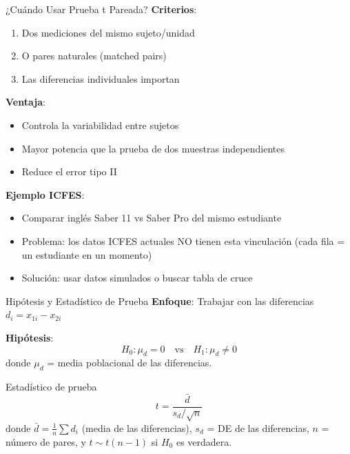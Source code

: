 \documentclass[aspectratio=169, 11pt]{beamer}
\begin{document}
\begin{frame}{¿Cuándo Usar Prueba t Pareada?}
\textbf{Criterios}:
\begin{enumerate}
  \item Dos mediciones del \alert{mismo} sujeto/unidad
  \item O pares naturales (matched pairs)
  \item Las diferencias individuales importan
\end{enumerate}

\vspace{0.3cm}
\textbf{Ventaja}:
\begin{itemize}
  \item Controla la variabilidad entre sujetos
  \item Mayor \alert{potencia} que la prueba de dos muestras independientes
  \item Reduce el error tipo II
\end{itemize}

\vspace{0.3cm}
\textbf{Ejemplo ICFES}:
\begin{itemize}
  \item Comparar inglés Saber 11 vs Saber Pro del mismo estudiante
  \item Problema: los datos ICFES actuales NO tienen esta vinculación (cada fila = un estudiante en un momento)
  \item Solución: usar datos simulados o buscar tabla de cruce
\end{itemize}
\end{frame}

\begin{frame}{Hipótesis y Estadístico de Prueba}
\textbf{Enfoque}: Trabajar con las \alert{diferencias} $d_i = x_{1i} - x_{2i}$

\vspace{0.2cm}
\textbf{Hipótesis}:
\[
H_0: \mu_d = 0 \quad \text{vs} \quad H_1: \mu_d \neq 0
\]
donde $\mu_d$ = media poblacional de las diferencias.

\vspace{0.15cm}
\begin{block}{Estad\'istico de prueba}
\vspace{-0.2cm}
\[
t = \frac{\bar{d}}{s_d / \sqrt{n}}
\]
\vspace{-0.3cm}
donde $\bar{d} = \frac{1}{n} \sum d_i$ (media de las diferencias), $s_d$ = DE de las diferencias, $n$ = n\'umero de pares, y $t \sim t(n-1)$ si $H_0$ es verdadera.
\end{block}
\end{frame}
\end{document}
